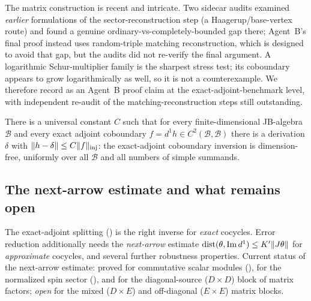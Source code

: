 \begin{remark}\label{rem:matrix-audit}
The matrix construction is recent and intricate. Two sidecar audits examined
\emph{earlier} formulations of the sector-reconstruction step (a
Haagerup/base-vertex route) and found a genuine ordinary-vs-completely-bounded
gap there; Agent~B's final proof instead uses random-triple matching
reconstruction, which is designed to avoid that gap, but the audits did not
re-verify the final argument. A logarithmic Schur-multiplier family is the
sharpest stress test; its coboundary appears to grow logarithmically as well, so
it is not a counterexample. We therefore record  as
an Agent~B proof claim at the exact-adjoint-benchmark level, with independent
re-audit of the matching-reconstruction steps still outstanding.
\end{remark}

\begin{corollary}\label{cor:adjoint-benchmark}
There is a universal constant $C$ such that for every finite-dimensional
JB-algebra $\mathcal B$ and every exact adjoint coboundary $f=d^1h\in
C^2(\mathcal B,\mathcal B)$ there is a derivation $\delta$ with
$\lVert h-\delta \rVert\le C\lVert f \rVert_{\mathrm{inj}}$: the exact-adjoint coboundary
inversion is dimension-free, uniformly over all $\mathcal B$ and all numbers of
simple summands.
\end{corollary}

\subsection{The next-arrow estimate and what remains open}\label{ssec:layer1-open}

The exact-adjoint splitting () is the right inverse
for \emph{exact} cocycles. Error reduction additionally needs the
\emph{next-arrow} estimate $\operatorname{dist}(\theta,\operatorname{Im} d^1)\le K'\lVert J\theta \rVert$
for \emph{approximate} cocycles, and several further robustness properties.
Current status of the next-arrow estimate: proved for commutative scalar modules
(), for the normalized spin sector
(), and for the diagonal-source ($D\times D$) block of
matrix factors; \emph{open} for the mixed ($D\times E$) and off-diagonal
($E\times E$) matrix blocks.

